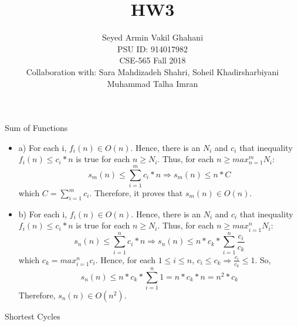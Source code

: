 \documentclass[12pt]{article}
\newenvironment{solution}[2][Solution]{\begin{trivlist}
\item[\hskip \labelsep {\bfseries #1}]}{\end{trivlist}}
\newenvironment{problem}[2][Problem]{\begin{trivlist}
\item[\hskip \labelsep {\bfseries #1}\hskip \labelsep {\bfseries #2.}]}{\end{trivlist}}
\begin{document}
 
\title{\textbf{HW3}}%
\author{Seyed Armin Vakil Ghahani\\ %
PSU ID: 914017982\\
CSE-565 Fall 2018\\
Collaboration with:
Sara Mahdizadeh Shahri, Soheil Khadirsharbiyani\\
Muhammad Talha Imran} %
 
\maketitle
\begin{problem}{1}
Sum of Functions
\end{problem}

\begin{solution}{}
\begin{itemize}
\item a) For each i, $f_i(n) \in O(n)$. Hence, there is an $N_i$ and $c_i$ that inequality
$f_{i} (n) \leq c_{i}*n$ is true for each $n \geq N_i$.
Thus, for each $n \geq max_{n=1}^{m} N_i$:
$$s_m(n) \leq \sum_{i=1}^{m} c_i*n \Rightarrow s_m(n) \leq n*C$$
which $C = \sum_{i=1}^{m} c_i$. Therefore, it proves that $s_m(n) \in O(n)$.

\item b) For each i, $f_i(n) \in O(n)$. Hence, there is an $N_i$ and $c_i$ that inequality
$f_{i} (n) \leq c_{i}*n$ is true for each $n \geq N_i$.
Thus, for each $n \geq max_{i=1}^{n} N_i$:
$$s_n(n) \leq \sum_{i=1}^{n} c_i*n \Rightarrow s_n(n) \leq n*c_k*\sum_{i=1}^{n} \frac{c_i}{c_k}$$
which $c_k = max_{i=1}^{n} c_i$. Hence, for each $1 \leq i \leq n$, $c_i \leq c_k \Rightarrow
\frac{c_i}{c_k} \leq 1$. So,
$$s_n(n) \leq n * c_k * \sum_{i=1}^{n} 1 = n*c_k*n = n^2*c_k$$
Therefore, $s_n(n) \in O(n^2)$.

\end{itemize}
\end{solution}

\begin{problem}{2}
Shortest Cycles
\end{problem}
\end{document}
